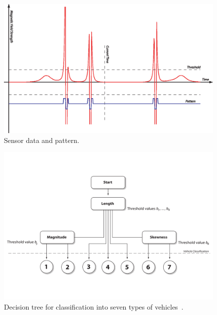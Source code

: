 \begin{figure}[htbf]
 \centering
 \begin{minipage}{0.9\linewidth}
 \centering
 \includegraphics[width=\linewidth]{images/sensordata}
 \caption[Sensor data and pattern]{Sensor data and pattern.}
 \label{fig:pattern}
 \end{minipage}
\end{figure}

\begin{figure}
 \centering
 \begin{minipage}{0.8\linewidth}
 \centering
 \includegraphics[width=1\linewidth]{images/decision}
 \caption[Decision tree for classification]{Decision tree for classification into seven types of vehicles~\cite{sun2000}.}
 \label{fig:decision}
 \end{minipage}
\end{figure}

